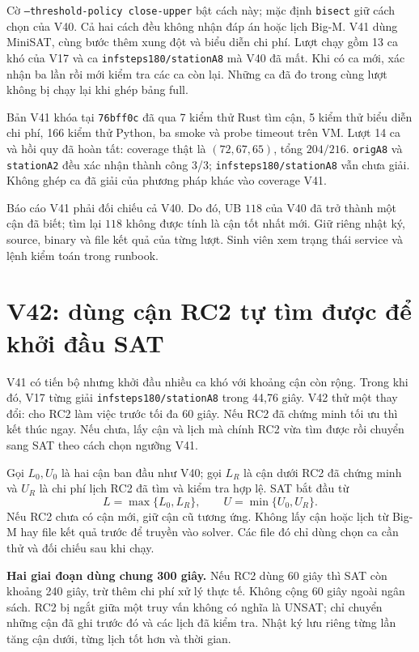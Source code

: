 \documentclass[11pt,a4paper]{article}
\newcommand{\code}[1]{\texttt{#1}}
\begin{document}
Cờ \code{--threshold-policy close-upper} bật cách này; mặc định
\code{bisect} giữ cách chọn của V40. Cả hai cách đều không nhận đáp án
hoặc lịch Big-M. V41 dùng MiniSAT, cùng bước thêm xung đột và biểu diễn
chi phí. Lượt chạy gồm 13 ca khó của V17 và ca
\code{infsteps180/stationA8} mà V40 đã mất. Khi có ca mới, xác nhận ba
lần rồi mới kiểm tra các ca còn lại. Những ca đã đo trong cùng lượt
không bị chạy lại khi ghép bảng full.

Bản V41 khóa tại \code{76bff0c} đã qua 7 kiểm thử Rust tìm cận, 5 kiểm
thử biểu diễn chi phí, 166 kiểm thử Python, ba smoke và probe timeout
trên VM. Lượt 14 ca và hồi quy đã hoàn tất: coverage thật là
$(72,67,65)$, tổng $204/216$. \code{origA8} và \code{stationA2} đều xác
nhận thành công 3/3; \code{infsteps180/stationA8} vẫn chưa giải. Không
ghép ca đã giải của phương pháp khác vào coverage V41.

Báo cáo V41 phải đối chiếu cả V40. Do đó, UB $118$ của V40 đã trở thành
một cận đã biết; tìm lại $118$ không được tính là cận tốt nhất mới. Giữ
riêng nhật ký, source, binary và file kết quả của từng lượt. Sinh viên
xem trạng thái service và lệnh kiểm toán trong runbook.

\section{V42: dùng cận RC2 tự tìm được để khởi đầu SAT}

V41 có tiến bộ nhưng khởi đầu nhiều ca khó với khoảng cận còn rộng.
Trong khi đó, V17 từng giải \code{infsteps180/stationA8} trong 44,76 giây.
V42 thử một thay đổi: cho RC2 làm việc trước tối đa 60 giây. Nếu RC2 đã
chứng minh tối ưu thì kết thúc ngay. Nếu chưa, lấy cận và lịch mà chính
RC2 vừa tìm được rồi chuyển sang SAT theo cách chọn ngưỡng V41.

Gọi $L_0,U_0$ là hai cận ban đầu như V40; gọi $L_R$ là cận dưới RC2 đã
chứng minh và $U_R$ là chi phí lịch RC2 đã tìm và kiểm tra hợp lệ. SAT
bắt đầu từ
\[
 L=\max\{L_0,L_R\},\qquad U=\min\{U_0,U_R\}.
\]
Nếu RC2 chưa có cận mới, giữ cận cũ tương ứng. Không lấy cận hoặc lịch
từ Big-M hay file kết quả trước để truyền vào solver. Các file đó chỉ
dùng chọn ca cần thử và đối chiếu sau khi chạy.

\textbf{Hai giai đoạn dùng chung 300 giây.} Nếu RC2 dùng 60 giây thì
SAT còn khoảng 240 giây, trừ thêm chi phí xử lý thực tế. Không cộng
60 giây ngoài ngân sách. RC2 bị ngắt giữa một truy vấn không có nghĩa
là UNSAT; chỉ chuyển những cận đã ghi trước đó và các lịch đã kiểm tra.
Nhật ký lưu riêng từng lần tăng cận dưới, từng lịch tốt hơn và thời gian.
\end{document}
